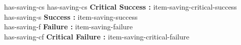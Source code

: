 \documentclass{article}
\begin{document}
        has-saving-cs \vspace{2mm}
        has-saving-cs \textbf{Critical Success :} item-saving-critical-success\\
        has-saving-s \textbf{Success :} item-saving-success\\
        has-saving-f \textbf{Failure :} item-saving-failure\\
        has-saving-cf \textbf{Critical Failure :} item-saving-critical-failure\\

    \endgroup
\end{document}
